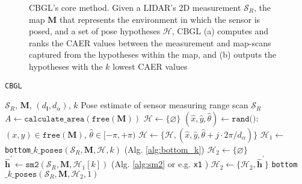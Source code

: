 \begin{figure}[]\centering
  
  \caption{\small CBGL's core method. Given a LIDAR's 2D measurement
           $\mathcal{S}_R$, the map $\bm{M}$ that represents the environment in
           which the sensor is posed, and a set of pose hypotheses
           $\mathcal{H}$, CBGL (a) computes and ranks the CAER values between
           the measurement and map-scans captured from the hypotheses within
           the map, and (b) outputs the hypotheses with the $k$ lowest CAER
           values}
  \label{fig:bottom_k}
\end{figure}


\begin{algorithm}
  \caption{\texttt{CBGL}}
  \begin{spacing}{1.2}
  \begin{algorithmic}[1]
    \REQUIRE $\mathcal{S}_R$, $\bm{M}$, $(d_{\bm{l}}, d_\alpha)$, $k$
    \ENSURE Pose estimate of sensor measuring range scan $\mathcal{S}_R$ %
    \STATE $A \leftarrow \texttt{calculate\_area}(\texttt{free}(\bm{M}))$
    \STATE $\mathcal{H} \leftarrow \{\varnothing\}$
      \STATE \small $(\hat{x},\hat{y},\hat{\theta}) \leftarrow \texttt{rand()}$: $(x,y) \in \texttt{free}(\bm{M})$, $\hat{\theta} \in [-\pi,+\pi)$
        \STATE $\mathcal{H} \leftarrow \{\mathcal{H}, (\hat{x}, \hat{y}, \hat{\theta} + j \cdot 2\pi / d_{\alpha})\}$
      \ENDFOR
    \ENDFOR
    \STATE $\mathcal{H}_1 \leftarrow$ \texttt{bottom}$\_k\_\texttt{poses}(\mathcal{S}_R, \bm{M}, \mathcal{H}, k)$ \hfill {\small (Alg. \ref{alg:bottom_k}})
    \STATE $\mathcal{H}_2 \leftarrow \{\varnothing \}$
      \STATE $\hat{\bm{h}}^\prime \leftarrow \texttt{sm2}(\mathcal{S}_R, \bm{M}, \mathcal{H}_1[k])$ \hfill {\small (Alg. \ref{alg:sm2} or e.g. \texttt{x1} \cite{Filotheou2023a}})
      \STATE $\mathcal{H}_2 \leftarrow \{\mathcal{H}_2, \hat{\bm{h}}^\prime\}$
    \ENDFOR
    \RETURN \texttt{bottom}$\_k\_\texttt{poses}(\mathcal{S}_R, \bm{M}, \mathcal{H}_2, 1)$
  \end{algorithmic}
  \end{spacing}
  \label{alg:cbgl}
\end{algorithm}

